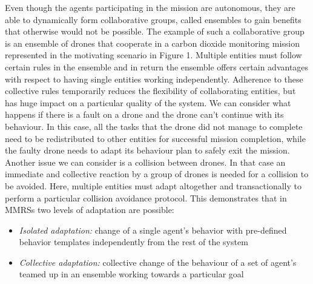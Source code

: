 \documentclass[journal]{IEEEtran}
\theoremstyle{definition}
\begin{document}
Even though the agents participating in the mission are autonomous, they are able to dynamically form collaborative groups, called ensembles \cite{bucchiarone2014collective} to gain benefits that otherwise would not be possible. %
The example of such a collaborative
group is an ensemble of drones that cooperate in a carbon dioxide monitoring mission represented in the motivating scenario in Figure 1. Multiple entities must follow certain rules in the ensemble and in return the ensemble offers certain
advantages with respect to having single entities working independently. Adherence to these collective
rules temporarily reduces the flexibility of collaborating entities, but has huge impact on a particular quality of the system. We can consider what happens if there is a fault on a drone and the drone can't continue with its behaviour. In this case, all the tasks that the drone did not manage to complete need to be redistributed to other entities for successful mission completion, while the faulty drone needs to adapt its behaviour plan to safely exit the mission. Another issue we can consider is a collision between drones. In that case an immediate and collective reaction by a group of drones is needed for a collision to be avoided. Here, multiple entities must adapt altogether and transactionally to perform a particular collision avoidance protocol. 
This demonstrates that in MMRSs two levels of adaptation are possible: 
\begin{itemize}
\item \textit{Isolated adaptation:} change of a single agent’s behavior with pre-defined behavior templates independently from the rest of the system
\item \textit{Collective adaptation:} collective change of the behaviour of a set of agent's teamed up in an ensemble working towards a  particular goal
\end{itemize}
\end{document}

